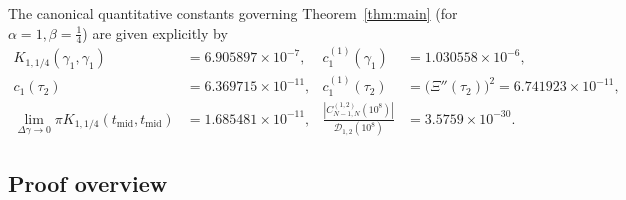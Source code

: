\documentclass[11pt,reqno]{amsart}
\theoremstyle{definition}
\theoremstyle{remark}
\numberwithin{equation}{section}
\begin{document}
The canonical quantitative constants governing Theorem~\ref{thm:main} (for $\alpha = 1, \beta = \frac{1}{4}$) are given explicitly by
\begin{equation}\label{eq:canonical_constants}
\begin{aligned}
K_{1,1/4}(\gamma_1, \gamma_1) &= 6.905897 \times 10^{-7}, & c_1^{(1)}(\gamma_1) &= 1.030558 \times 10^{-6}, \\
c_1(\tau_2) &= 6.369715 \times 10^{-11}, & c_1^{(1)}(\tau_2) &= \bigl(\Xi''(\tau_2)\bigr)^2 = 6.741923 \times 10^{-11}, \\
\lim_{\Delta\gamma \to 0} \pi K_{1,1/4}(t_{\mathrm{mid}}, t_{\mathrm{mid}}) &= 1.685481 \times 10^{-11}, & \frac{|C_{N-1,N}^{(1,2)}(10^8)|}{\mathcal{D}_{1,2}(10^8)} &= 3.5759 \times 10^{-30}.
\end{aligned}
\end{equation}

\subsection{Proof overview}\label{subsec:proof_overview}
\end{document}
